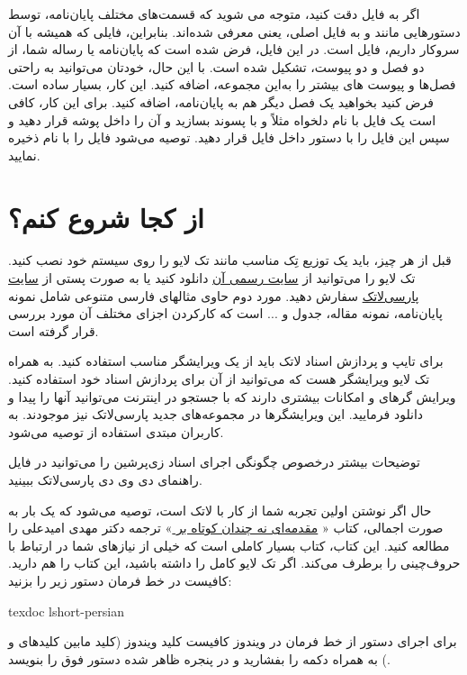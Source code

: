 اگر به فایل 
دقت کنید، متوجه می شوید که قسمت‌های مختلف پایان‌نامه، توسط دستورهایی مانند 
و
به فایل اصلی، یعنی 
معرفی شده‌اند. بنابراین، فایلی که همیشه با آن سروکار داریم، فایل 
است.
در این فایل، فرض شده است که پایان‌نامه یا رساله شما، از دو فصل و دو پیوست، تشکیل شده است. با این حال، خودتان می‌توانید به راحتی فصل‌ها و پیوست های بیشتر را به‌این مجموعه، اضافه کنید. این کار، بسیار ساده است. فرض کنید بخواهید یک فصل دیگر هم به پایان‌نامه، اضافه کنید. برای این کار، کافی است یک فایل با نام دلخواه مثلاً 
و با پسوند 
بسازید و آن را داخل پوشه 
قرار دهید و سپس این فایل را با دستور 
\verb!!
داخل فایل
 قرار دهید. توصیه می‌شود فایل 
 را با نام 
 ذخیره نمایید.

\section{از کجا شروع کنم؟}
قبل از هر چیز، باید یک توزیع تِک مناسب مانند تک لایو
را روی سیستم خود نصب کنید. تک لایو  را می‌توانید از 
 \href{http://www.tug.org/texlive}{سایت رسمی آن}%
 دانلود کنید یا به صورت پستی از 
 \href{http://www.parsilatex.com}{سایت پارسی‌لاتک}%
سفارش دهید. مورد دوم حاوی مثالهای فارسی متنوعی شامل نمونه پایان‌نامه، نمونه مقاله، جدول و ... است که کارکردن اجزای مختلف آن مورد بررسی قرار گرفته است.

برای تایپ و پردازش اسناد لاتک باید از یک ویرایشگر مناسب استفاده کنید. به همراه تک لایو ویرایشگر  هست که می‌توانید از آن برای پردازش اسناد خود استفاده کنید. 
ویرایش گرهای  
و
امکانات بیشتری دارند که با جستجو در اینترنت می‌توانید آنها را پیدا و دانلود فرمایید. این ویرایشگرها در مجموعه‌های جدید پارسی‌لاتک نیز موجودند. به کاربران مبتدی استفاده از 
توصیه می‌شود.

 توضیحات بیشتر درخصوص چگونگی اجرای اسناد زی‌پرشین را می‌توانید در فایل راهنمای دی وی دی پارسی‌لاتک ببینید.
 
 حال اگر نوشتن \پ اولین تجربه شما از کار با لاتک است، توصیه می‌شود که یک بار به صورت اجمالی، کتاب «%
\href{http://www.tug.ctan.org/tex-archive/info/lshort/persian/lshort.pdf}{مقدمه‌ای نه چندان کوتاه بر
\lr{\LaTeXe}}»
   ترجمه دکتر مهدی امیدعلی را مطالعه کنید. این کتاب، کتاب بسیار کاملی است که خیلی از نیازهای شما در ارتباط با حروف‌چینی را برطرف می‌کند. اگر تک لایو کامل را داشته باشید، این کتاب را هم دارید. کافیست در خط فرمان دستور زیر را بزنید:
\begin{latin}
texdoc lshort-persian
\end{latin}
برای اجرای دستور از خط فرمان در ویندوز کافیست کلید ویندوز (کلید مابین کلیدهای 
 و 
) به همراه دکمه 
را بفشارید و در پنجره ظاهر شده دستور فوق را بنویسد.

